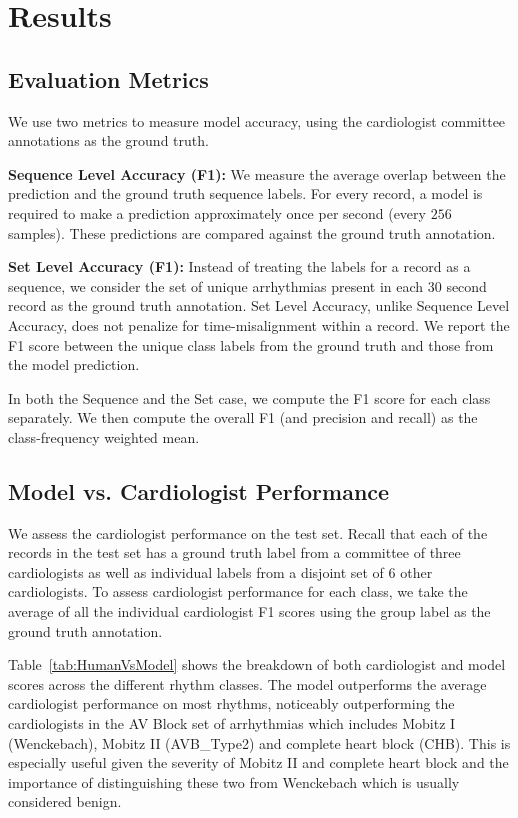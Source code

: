 \documentclass{article}
\begin{document}
\section{Results}
\label{results}
\subsection*{Evaluation Metrics}
We use two metrics to measure model accuracy, using the cardiologist committee annotations as the ground truth.

\textbf{Sequence Level Accuracy (F1):} We measure the average overlap between the prediction and the ground truth sequence labels. For every record, a model is required to make a prediction approximately once per second (every $256$ samples). These predictions are compared against the ground truth annotation.

\textbf{Set Level Accuracy (F1):} Instead of treating the labels for a record as a sequence, we consider the set of unique arrhythmias present in each $30$ second record as the ground truth annotation. Set Level Accuracy, unlike Sequence Level Accuracy, does not penalize for time-misalignment within a record. We report the F1 score between the unique class labels from the ground truth and those from the model prediction.

In both the Sequence and the Set case, we compute the F1 score for each class separately. We then compute the overall F1 (and precision and recall) as the class-frequency weighted mean.

\subsection*{Model vs. Cardiologist Performance}
We assess the cardiologist performance on the test set. Recall that each of the records in the test set has a ground truth label from a committee of three cardiologists as well as individual labels from a disjoint set of 6 other cardiologists. To assess cardiologist performance for each class, we take the average of all the individual cardiologist F1 scores using the group label as the ground truth annotation.

Table~\ref{tab:HumanVsModel} shows the breakdown of both cardiologist and model scores across the different rhythm classes. The model outperforms the average cardiologist performance on most rhythms, noticeably outperforming the cardiologists in the AV Block set of arrhythmias which includes Mobitz I (Wenckebach), Mobitz II (AVB\_Type2) and complete heart block (CHB). This is especially useful given the severity of Mobitz II and complete heart block and the importance of distinguishing these two from Wenckebach which is usually considered benign.
\end{document}

